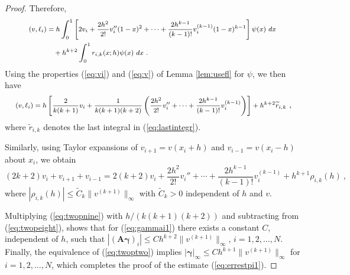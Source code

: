 \documentclass{amsart}
\newcommand{\bA}{\mathbf{A}}
\newcommand{\bgamma}{\boldsymbol{\gamma}}
\begin{document}
\begin{proof}
Therefore,
\begin{equation}\label{eq:lastintegr}
\text{\footnotesize
$\begin{aligned}
(v,\ell_i) &=h\int_0^1 \left[2v_i+\frac{2h^2}{2!}v_i''(1-x)^2+\cdots+\frac{2h^{k-1}}{(k-1)!}v_i^{(k-1)}(1-x)^{k-1} \right]\psi(x)~dx\\
& \quad +h^{k+2}\int_0^1 r_{i,k}(x;h)\psi(x)~dx\ .
\end{aligned}$
}
\end{equation}
%
Using the properties (\ref{eq:vi}) and (\ref{eq:v}) of Lemma \ref{lem:usefl} for $\psi$, we then have
%
\begin{equation}\label{eq:twopeight}
\text{\footnotesize
    $(v,\ell_i)=h\left[\frac{2}{k(k+1)}v_i+\frac{1}{k(k+1)(k+2)}\left(\frac{2h^2}{2!}v_i''+ \cdots +\frac{2h^{k-1}}{(k-1)!}v_i^{(k-1)}\right) \right] + h^{k+2} \widetilde{r}_{i,k}$}\ ,
\end{equation}
%
where $\widetilde{r}_{i,k}$ denotes the last integral in (\ref{eq:lastintegr}).

Similarly, using Taylor expansions of $v_{i+1}=v(x_i+h)$ and $v_{i-1}=v(x_i-h)$ about $x_i$, we obtain
\begin{equation}\label{eq:twopnine}
(2k+2)v_i +v_{i+1}+v_{i-1}=2(k+2) v_i+\frac{2h^2}{2!}v_i''+\cdots+\frac{2h^{k-1}}{(k-1)!}v_i^{(k-1)}+h^{k+1}\rho_{i,k}(h)\ ,
\end{equation}
where $|\rho_{i,k}(h)|\leq \widetilde{C}_k\|v^{(k+1)}\|_\infty$ with $\widetilde{C}_k>0$ independent of $h$ and $v$.

Multiplying (\ref{eq:twopnine}) with $h/(k(k+1)(k+2))$ and subtracting from (\ref{eq:twopeight}), shows that for (\ref{eq:gammai1}) there exists a constant $C$, independent of $h$, such that
$|(\bA\bgamma)_i|\leq Ch^{k+2}\|v^{(k+1)}\|_\infty$, $i=1,2,\dots,N$.
Finally, the equivalence of (\ref{eq:twoptwo}) implies $|\bgamma|_\infty\leq Ch^{k+1}\|v^{(k+1)}\|_\infty$ for $i=1,2,\dots,N$, which completes the proof of the estimate (\ref{eq:errestpi1}).
\end{proof}
\end{document}

